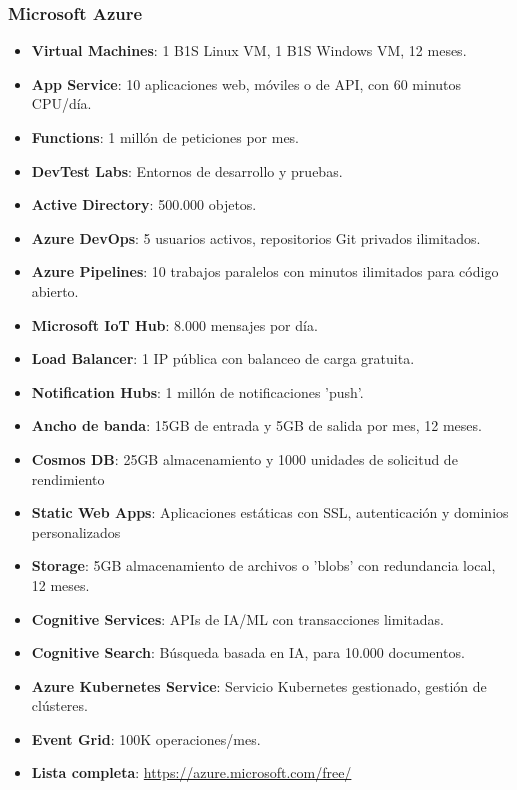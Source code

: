 \subsubsection*{Microsoft Azure}
\begin{itemize}
	\item \textbf{Virtual Machines}: 1 B1S Linux VM, 1 B1S Windows VM, 12 meses.
	\item \textbf{App Service}: 10 aplicaciones web, móviles o de API, con 60 minutos CPU/día.
	\item \textbf{Functions}: 1 millón de peticiones por mes.
	\item \textbf{DevTest Labs}: Entornos de desarrollo y pruebas.
	\item \textbf{Active Directory}: 500.000 objetos.
	\item \textbf{Azure DevOps}: 5 usuarios activos, repositorios Git privados ilimitados.
	\item \textbf{Azure Pipelines}: 10 trabajos paralelos con minutos ilimitados para código abierto.
	\item \textbf{Microsoft IoT Hub}: 8.000 mensajes por día.
	\item \textbf{Load Balancer}: 1 IP pública con balanceo de carga gratuita.
	\item \textbf{Notification Hubs}: 1 millón de notificaciones 'push'.
	\item \textbf{Ancho de banda}: 15GB de entrada y 5GB de salida por mes, 12 meses.
	\item \textbf{Cosmos DB}: 25GB almacenamiento y 1000 unidades de solicitud de rendimiento
	\item \textbf{Static Web Apps}: Aplicaciones estáticas con SSL, autenticación y dominios personalizados
	\item \textbf{Storage}: 5GB almacenamiento de archivos o 'blobs' con redundancia local, 12 meses.
	\item \textbf{Cognitive Services}: APIs de IA/ML con transacciones limitadas.
	\item \textbf{Cognitive Search}: Búsqueda basada en IA, para 10.000 documentos.
	\item \textbf{Azure Kubernetes Service}: Servicio Kubernetes gestionado, gestión de clústeres.
	\item \textbf{Event Grid}: 100K operaciones/mes.
	\item \textbf{Lista completa}: \url{https://azure.microsoft.com/free/}
\end{itemize}

